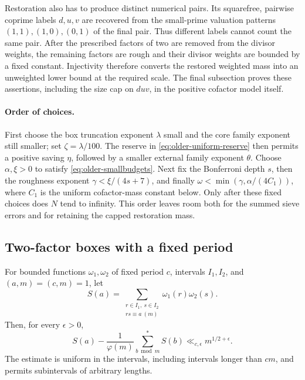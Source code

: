 Restoration also has to produce distinct numerical pairs. Its
squarefree, pairwise coprime labels \(d,u,v\) are recovered from the
small-prime valuation patterns \((1,1),(1,0),(0,1)\) of the final
pair. Thus different labels cannot count the same pair. After the
prescribed factors of two are removed from the divisor weights,
the remaining factors are rough and their divisor weights are
bounded by a fixed constant. Injectivity therefore converts the
restored weighted mass into an unweighted lower bound at the required
scale. The final subsection proves these assertions, including the
size cap on \(duv\), in the positive cofactor model itself.

\paragraph{Order of choices.}
First choose the box truncation exponent \(\lambda\) small and the
core family exponent still smaller; set \(\zeta=\lambda/100\).
The reserve in \eqref{eq:older-uniform-reserve} then permits a positive
saving \(\eta\), followed by a smaller external family exponent
\(\theta\). Choose \(\alpha,\xi>0\) to satisfy
\eqref{eq:older-smallbudgets}. Next fix the Bonferroni depth \(s\),
then the roughness exponent \(\gamma<\xi/(4s+7)\), and finally
\(\omega<\min(\gamma,\alpha/(4C_1))\), where \(C_1\) is the uniform
cofactor-mass constant below. Only after these fixed choices does
\(N\) tend to infinity. This order leaves room both for the summed
sieve errors and for retaining the capped restoration mass.

\subsection{Two-factor boxes with a fixed period}

For bounded functions \(\omega_1,\omega_2\) of fixed period \(c\),
intervals \(I_1,I_2\), and \((a,m)=(c,m)=1\), let
\[
 S(a)=\sum_{\substack{r\in I_1,\ s\in I_2\\rs\equiv a\ (m)}}
                        \omega_1(r)\omega_2(s).
\]
Then, for every \(\epsilon>0\),
\begin{equation}\label{eq:older-box}
 S(a)-\frac1{\varphi(m)}\sum_{b\bmod m}^{*}S(b)
                         \ll_{c,\epsilon}m^{1/2+\epsilon}.
\end{equation}
The estimate is uniform in the intervals, including intervals longer
than \(cm\), and permits subintervals of arbitrary lengths.

